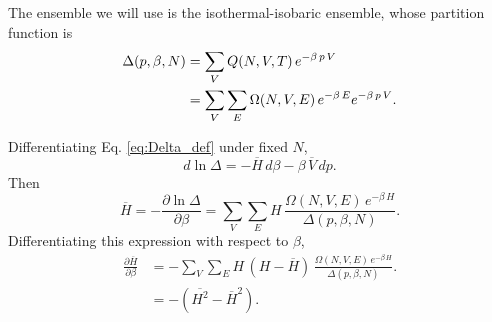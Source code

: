 \documentclass[twocolumn, 10pt]{article}
\numberwithin{equation}{section}
\newenvironment{solution}[1][\empty]
{\par\medskip\sffamily
  \textbf{\ifx\empty#1{Solution.}\relax\else{#1}\fi} \ignorespaces}
{\medskip}
\begin{document}
\begin{solution}
  The ensemble we will use is the isothermal-isobaric ensemble,
  whose partition function is
  \begin{align}
    \Delta(p, \beta, N)
    &=
    \sum_V Q(N, V, T) \, e^{-\beta \, p \, V}
    \notag
    \\
    &=
    \sum_V \sum_E \Omega(N, V, E) \,
    e^{-\beta \, E } e^{-\beta \, p \, V}
    .
    \label{eq:Delta_def}
  \end{align}

  Differentiating Eq. \eqref{eq:Delta_def}
  under fixed $N$,
  \begin{equation}
    d\ln\Delta
    =
    -\overline{H} \, d\beta
    -\beta \, \overline{V} \, dp.
    \label{eq:firstlawlnDelta}
  \end{equation}
  Then
  $$
  \overline H
  =
  -\frac{ \partial \ln \Delta } { \partial \beta }
  =
  \sum_{V}\sum_{E} H \,
  \frac{ \Omega(N, V, E) \, e^{-\beta \, H} } { \Delta(p, \beta, N) }.
  $$
  Differentiating this expression with respect to $\beta$,
  \begin{align*}
  \frac{ \partial \overline H } { \partial \beta }
  &=
  -\sum_{V}\sum_{E} H \, (H - \overline H) \,
  \frac{ \Omega(N, V, E) \, e^{-\beta \, H} } { \Delta(p, \beta, N) }.
  \\
  &=
  -\left(
  \overline{ H^2 } - \overline H^2 \right).
  \end{align*}


\end{solution}
\end{document}
